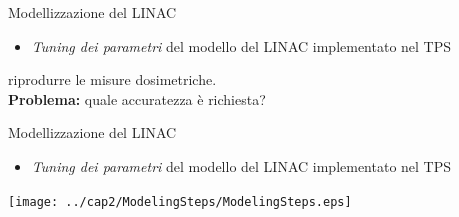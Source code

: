 \documentclass{beamer}
\begin{document}
\begin{frame}[t]{Modellizzazione del LINAC}
\begin{itemize}
\scriptsize
{}
\item \alert{\textit{Tuning dei parametri} del modello del LINAC implementato nel TPS}
\end{itemize}
\vspace{.2cm}

\footnotesize
{} riprodurre le misure dosimetriche.\\\vspace{.2cm}
\alert{\textbf{Problema:}} quale accuratezza è richiesta?\\
\end{frame}




\begin{frame}{Modellizzazione del LINAC}
\begin{itemize}
\scriptsize
{}
\item \alert{\textit{Tuning dei parametri} del modello del LINAC implementato nel TPS}
\end{itemize}
\vspace{.5cm}
\centering
\texttt{[image: ../cap2/ModelingSteps/ModelingSteps.eps]}
\end{frame}
\end{document}
